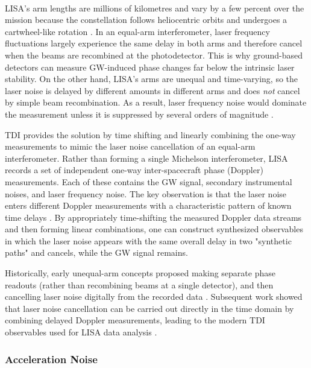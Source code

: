 \documentclass[a4paper,12pt]{article}
\begin{document}
\paragraph{}
LISA’s arm lengths are millions of kilometres and vary by a few percent over the mission because the constellation follows heliocentric orbits and undergoes a cartwheel-like rotation \cite{tinto2014time}. In an equal-arm interferometer, laser frequency fluctuations largely experience the same delay in both arms and therefore cancel when the beams are recombined at the photodetector. This is why ground-based detectors can measure GW-induced phase changes far below the intrinsic laser stability. On the other hand, LISA's arms are unequal and time-varying, so the laser noise is delayed by different amounts in different arms and does \emph{not} cancel by simple beam recombination. As a result, laser frequency noise would dominate the measurement unless it is suppressed by several orders of magnitude \cite{tinto2014time}.

TDI provides the solution by time shifting and linearly combining the one-way measurements to mimic the laser noise cancellation of an equal-arm interferometer. Rather than forming a single Michelson interferometer, LISA records a set of independent one-way inter-spacecraft phase (Doppler) measurements. Each of these contains the GW signal, secondary instrumental noises, and laser frequency noise. The key observation is that the laser noise enters different Doppler measurements with a characteristic pattern of known time delays \cite{tinto2014time}. By appropriately time-shifting the measured Doppler data streams and then forming linear combinations, one can construct synthesized observables in which the laser noise appears with the same overall delay in two "synthetic paths" and cancels, while the GW signal remains.

Historically, early unequal-arm concepts proposed making separate phase readouts (rather than recombining beams at a single detector), and then cancelling laser noise digitally from the recorded data \cite{faller1984possible,faller1989antenna}. Subsequent work showed that laser noise cancellation can be carried out directly in the time domain by combining delayed Doppler measurements, leading to the modern TDI observables used for LISA data analysis \cite{tinto1999cancellation,tinto2014time}.

\subsubsection{Acceleration Noise}
\end{document}
